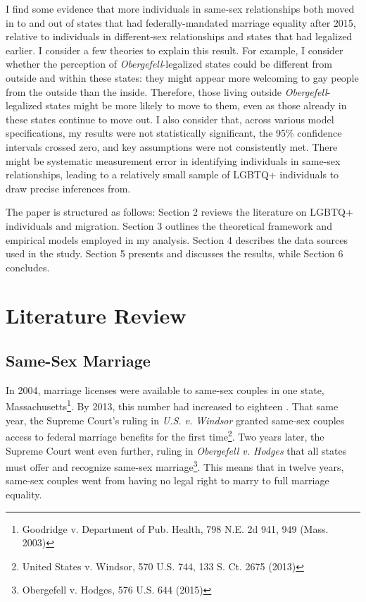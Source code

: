 \documentclass[12pt,letterpaper]{article}
\begin{document}
I find some evidence that more individuals in same-sex relationships  both moved in to and out of states that had federally-mandated marriage equality after 2015, relative to individuals in different-sex relationships and states that had legalized earlier. I consider a few theories to explain this result. For example, I consider whether the perception of \textit{Obergefell}-legalized states could be different from outside and within these states: they might appear more welcoming to gay people from the outside than the inside. Therefore, those living outside \textit{Obergefell}-legalized states might be more likely to move to them, even as those already in these states continue to move out. I also consider that, across various model specifications, my results were not statistically significant, the 95\% confidence intervals crossed zero, and key assumptions were not consistently met. There might be systematic measurement error in identifying individuals in same-sex relationships, leading to a relatively small sample of LGBTQ+ individuals to draw precise inferences from.

The paper is structured as follows: Section 2 reviews the literature on LGBTQ+ individuals and migration. Section 3 outlines the theoretical framework and empirical models employed in my analysis. Section 4 describes the data sources used in the study. Section 5 presents and discusses the results, while Section 6 concludes.

\section{Literature Review}
\subsection{Same-Sex Marriage}
In 2004, marriage licenses were available to same-sex couples in one state, Massachusetts\footnote{Goodridge v. Department of Pub. Health, 798 N.E. 2d 941, 949 (Mass. 2003)}. By 2013, this number had increased to eighteen \citep{27}. That same year, the Supreme Court's ruling in \textit{U.S. v. Windsor} granted same-sex couples access to federal marriage benefits for the first time\footnote{United States v. Windsor, 570 U.S. 744, 133 S. Ct. 2675 (2013)}. Two years later, the Supreme Court went even further, ruling in \textit{Obergefell v. Hodges} that all states must offer and recognize same-sex marriage\footnote{Obergefell v. Hodges, 576 U.S. 644 (2015)}. This means that in twelve years, same-sex couples went from having no legal right to marry to full marriage equality. 
\end{document}
